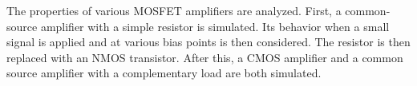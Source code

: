The properties of various MOSFET amplifiers are analyzed. First, a common-source amplifier with a simple resistor is simulated. Its behavior when a small signal is applied and at various bias points is then considered. The resistor is then replaced with an NMOS transistor. After this, a CMOS amplifier and a common source amplifier with a complementary load are both simulated.
